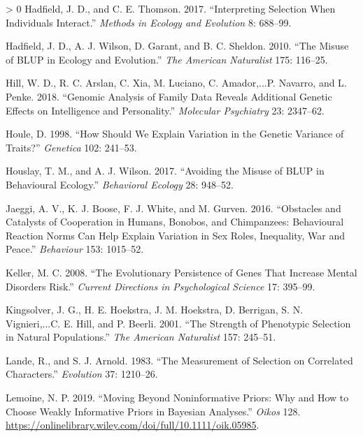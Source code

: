 \documentclass{article}
\newlength{\cslhangindent}
\newenvironment{CSLReferences}[3] %
 {%
  \setlength{\parindent}{0pt}
  \ifodd #1 \everypar{\setlength{\hangindent}{\cslhangindent}}\ignorespaces\fi
  \ifnum #2 > 0
  \setlength{\parskip}{#2\baselineskip}
  \fi
 }%
 {}
\begin{document}
\begin{CSLReferences}{1}{0}
\leavevmode\hypertarget{ref-Hadfield2017}{}%
Hadfield, J. D., and C. E. Thomson. 2017. {``Interpreting Selection When
Individuals Interact.''} \emph{Methods in Ecology and Evolution} 8:
688--99.

\leavevmode\hypertarget{ref-Hadfield2010}{}%
Hadfield, J. D., A. J. Wilson, D. Garant, and B. C. Sheldon. 2010.
{``The Misuse of BLUP in Ecology and Evolution.''} \emph{The American
Naturalist} 175: 116--25.

\leavevmode\hypertarget{ref-Hill2018}{}%
Hill, W. D., R. C. Arslan, C. Xia, M. Luciano, C. Amador,...P. Navarro,
and L. Penke. 2018. {``Genomic Analysis of Family Data Reveals
Additional Genetic Effects on Intelligence and Personality.''}
\emph{Molecular Psychiatry} 23: 2347--62.

\leavevmode\hypertarget{ref-Houle1998}{}%
Houle, D. 1998. {``How Should We Explain Variation in the Genetic
Variance of Traits?''} \emph{Genetica} 102: 241--53.

\leavevmode\hypertarget{ref-Hous2017}{}%
Houslay, T. M., and A. J. Wilson. 2017. {``Avoiding the Misuse of BLUP
in Behavioural Ecology.''} \emph{Behavioral Ecology} 28: 948--52.

\leavevmode\hypertarget{ref-Jaeggi2016}{}%
Jaeggi, A. V., K. J. Boose, F. J. White, and M. Gurven. 2016.
{``Obstacles and Catalysts of Cooperation in Humans, Bonobos, and
Chimpanzees: Behavioural Reaction Norms Can Help Explain Variation in
Sex Roles, Inequality, War and Peace.''} \emph{Behaviour} 153: 1015--52.

\leavevmode\hypertarget{ref-Keller2008}{}%
Keller, M. C. 2008. {``The Evolutionary Persistence of Genes That
Increase Mental Disorders Risk.''} \emph{Current Directions in
Psychological Science} 17: 395--99.

\leavevmode\hypertarget{ref-Kingsolver2001}{}%
Kingsolver, J. G., H. E. Hoekstra, J. M. Hoekstra, D. Berrigan, S. N.
Vignieri,...C. E. Hill, and P. Beerli. 2001. {``The Strength of
Phenotypic Selection in Natural Populations.''} \emph{The American
Naturalist} 157: 245--51.

\leavevmode\hypertarget{ref-Lande1983}{}%
Lande, R., and S. J. Arnold. 1983. {``The Measurement of Selection on
Correlated Characters.''} \emph{Evolution} 37: 1210--26.

\leavevmode\hypertarget{ref-Lemoine2019}{}%
Lemoine, N. P. 2019. {``Moving Beyond Noninformative Priors: Why and How
to Choose Weakly Informative Priors in Bayesian Analyses.''}
\emph{Oikos} 128.
\url{https://onlinelibrary.wiley.com/doi/full/10.1111/oik.05985}.


\end{CSLReferences}
\end{document}
